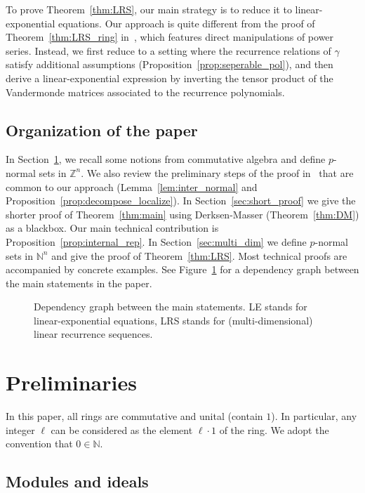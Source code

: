 \documentclass[letterpaper, 11pt, thm-restate]{article}
\numberwithin{equation}{section}
\newcommand{\Z}{\mathbb{Z}}
\newcommand{\N}{\mathbb{N}}
\theoremstyle{definition}
\theoremstyle{definition}
\theoremstyle{definition}
\begin{document}
To prove Theorem~\ref{thm:LRS}, our main strategy is to reduce it to linear-exponential equations.
Our approach is quite different from the proof of Theorem~\ref{thm:LRS_ring} in~\cite{dong2025skolemproblemringspositive}, which features direct manipulations of power series.
Instead, we first reduce to a setting where the recurrence relations of $\gamma$ satisfy additional assumptions (Proposition~\ref{prop:seperable_pol}), and then derive a linear-exponential expression by inverting the tensor product of the Vandermonde matrices associated to the recurrence polynomials.

\subsection*{Organization of the paper}
In Section~\ref{sec:prelim}, we recall some notions from commutative algebra and define $p$-normal sets in $\Z^n$. 
We also review the preliminary steps of the proof in~\cite{dong2025s} that are common to our approach (Lemma~\ref{lem:inter_normal} and Proposition~\ref{prop:decompose_localize}).
In Section~\ref{sec:short_proof} we give the shorter proof of Theorem~\ref{thm:main} using Derksen-Masser (Theorem~\ref{thm:DM}) as a blackbox.
Our main technical contribution is Proposition~\ref{prop:internal_rep}.
In Section~\ref{sec:multi_dim} we define $p$-normal sets in $\N^n$ and give the proof of Theorem~\ref{thm:LRS}.
Most technical proofs are accompanied by concrete examples.
See Figure~\ref{fig:roadmap} for a dependency graph between the main statements in the paper.

\begin{figure}[h!]
    \centering
    \figureroadmap
    \caption{Dependency graph between the main statements. LE stands for linear-exponential equations, LRS stands for (multi-dimensional) linear recurrence sequences.}
    \label{fig:roadmap}
\end{figure}

\section{Preliminaries}\label{sec:prelim}
In this paper, all rings are commutative and unital (contain $1$).
In particular, any integer $\ell$ can be considered as the element $\ell \cdot 1$ of the ring.
We adopt the convention that $0 \in \N$.

\subsection{Modules and ideals}\label{subsec:prelim_module}
\end{document}
